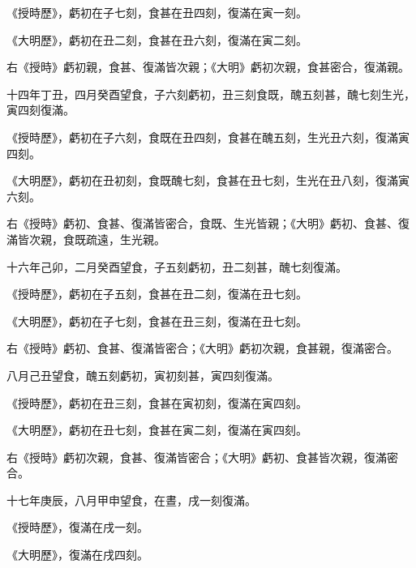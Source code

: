 \begin{pinyinscope}
 《授時歷》，虧初在子七刻，食甚在丑四刻，復滿在寅一刻。



 《大明歷》，虧初在丑二刻，食甚在丑六刻，復滿在寅二刻。



 右《授時》虧初親，食甚、復滿皆次親；《大明》虧初次親，食甚密合，復滿親。



 十四年丁丑，四月癸酉望食，子六刻虧初，丑三刻食既，醜五刻甚，醜七刻生光，寅四刻復滿。



 《授時歷》，虧初在子六刻，食既在丑四刻，食甚在醜五刻，生光丑六刻，復滿寅四刻。



 《大明歷》，虧初在丑初刻，食既醜七刻，食甚在丑七刻，生光在丑八刻，復滿寅六刻。



 右《授時》虧初、食甚、復滿皆密合，食既、生光皆親；《大明》虧初、食甚、復滿皆次親，食既疏遠，生光親。



 十六年己卯，二月癸酉望食，子五刻虧初，丑二刻甚，醜七刻復滿。



 《授時歷》，虧初在子五刻，食甚在丑二刻，復滿在丑七刻。



 《大明歷》，虧初在子七刻，食甚在丑三刻，復滿在丑七刻。



 右《授時》虧初、食甚、復滿皆密合；《大明》虧初次親，食甚親，復滿密合。



 八月己丑望食，醜五刻虧初，寅初刻甚，寅四刻復滿。



 《授時歷》，虧初在丑三刻，食甚在寅初刻，復滿在寅四刻。



 《大明歷》，虧初在丑七刻，食甚在寅二刻，復滿在寅四刻。



 右《授時》虧初次親，食甚、復滿皆密合；《大明》虧初、食甚皆次親，復滿密合。



 十七年庚辰，八月甲申望食，在晝，戌一刻復滿。



 《授時歷》，復滿在戌一刻。



 《大明歷》，復滿在戌四刻。




\end{pinyinscope}
